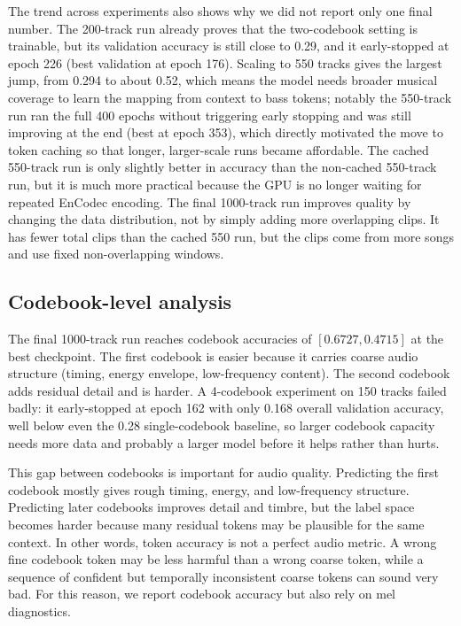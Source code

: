 \documentclass{article}
\begin{document}
The trend across experiments also shows why we did not report only one final number. The 200-track run already proves that the two-codebook setting is trainable, but its validation accuracy is still close to 0.29, and it early-stopped at epoch 226 (best validation at epoch 176). Scaling to 550 tracks gives the largest jump, from 0.294 to about 0.52, which means the model needs broader musical coverage to learn the mapping from context to bass tokens; notably the 550-track run ran the full 400 epochs without triggering early stopping and was still improving at the end (best at epoch 353), which directly motivated the move to token caching so that longer, larger-scale runs became affordable. The cached 550-track run is only slightly better in accuracy than the non-cached 550-track run, but it is much more practical because the GPU is no longer waiting for repeated EnCodec encoding. The final 1000-track run improves quality by changing the data distribution, not by simply adding more overlapping clips. It has fewer total clips than the cached 550 run, but the clips come from more songs and use fixed non-overlapping windows.

\subsection{Codebook-level analysis}

The final 1000-track run reaches codebook accuracies of $[0.6727, 0.4715]$ at the best checkpoint. The first codebook is easier because it carries coarse audio structure (timing, energy envelope, low-frequency content). The second codebook adds residual detail and is harder. A 4-codebook experiment on 150 tracks failed badly: it early-stopped at epoch 162 with only 0.168 overall validation accuracy, well below even the 0.28 single-codebook baseline, so larger codebook capacity needs more data and probably a larger model before it helps rather than hurts.

This gap between codebooks is important for audio quality. Predicting the first codebook mostly gives rough timing, energy, and low-frequency structure. Predicting later codebooks improves detail and timbre, but the label space becomes harder because many residual tokens may be plausible for the same context. In other words, token accuracy is not a perfect audio metric. A wrong fine codebook token may be less harmful than a wrong coarse token, while a sequence of confident but temporally inconsistent coarse tokens can sound very bad. For this reason, we report codebook accuracy but also rely on mel diagnostics.
\end{document}
